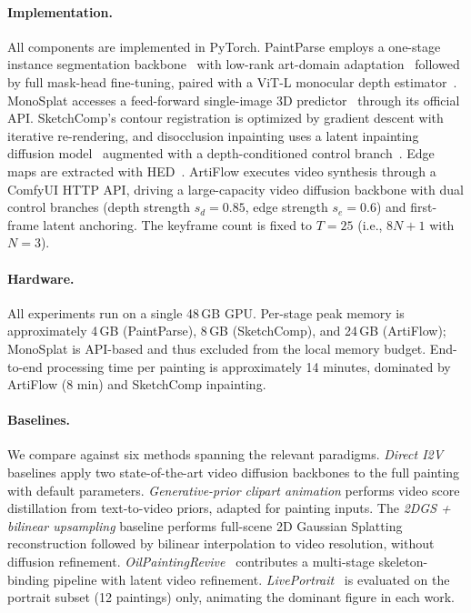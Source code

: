 \paragraph{Implementation.}
All components are implemented in PyTorch. PaintParse employs a
one-stage instance segmentation backbone~\cite{jocher2023yolov8} with
low-rank art-domain adaptation~\cite{hu2022lora} followed by full
mask-head fine-tuning, paired with a ViT-L monocular depth
estimator~\cite{yang2024depthanything}. MonoSplat accesses a
feed-forward single-image 3D predictor~\cite{tripo2025tritosplat}
through its official API. SketchComp's contour registration is
optimized by gradient descent with iterative re-rendering, and
disocclusion inpainting uses a latent inpainting diffusion
model~\cite{rombach2022ldm,lugmayr2022repaint} augmented with a
depth-conditioned control branch~\cite{zhang2023controlnet}. Edge maps
are extracted with HED~\cite{xie2015hed}. ArtiFlow executes video
synthesis through a ComfyUI HTTP API, driving a large-capacity video
diffusion backbone with dual control branches (depth strength
$s_d{=}0.85$, edge strength $s_e{=}0.6$) and first-frame latent
anchoring. The keyframe count is fixed to $T=25$ (i.e., $8N{+}1$ with
$N{=}3$).

\paragraph{Hardware.}
All experiments run on a single 48\,GB GPU. Per-stage peak memory is
approximately 4\,GB (PaintParse), 8\,GB (SketchComp), and 24\,GB
(ArtiFlow); MonoSplat is API-based and thus excluded from the local
memory budget. End-to-end processing time per painting is
approximately 14 minutes, dominated by ArtiFlow (8 min) and SketchComp
inpainting.

\paragraph{Baselines.}
We compare against six methods spanning the relevant paradigms.
\emph{Direct I2V} baselines apply two state-of-the-art video diffusion
backbones to the full painting with default parameters.
\emph{Generative-prior clipart animation} performs video score
distillation from text-to-video priors, adapted for painting inputs.
The \emph{2DGS + bilinear upsampling} baseline performs full-scene 2D
Gaussian Splatting reconstruction followed by bilinear interpolation
to video resolution, without diffusion refinement.
\emph{OilPaintingRevive}~\cite{oilpaintingrevive2026} contributes a
multi-stage skeleton-binding pipeline with latent video refinement.
\emph{LivePortrait}~\cite{guo2024liveportrait} is evaluated on the
portrait subset (12 paintings) only, animating the dominant figure in
each work.

